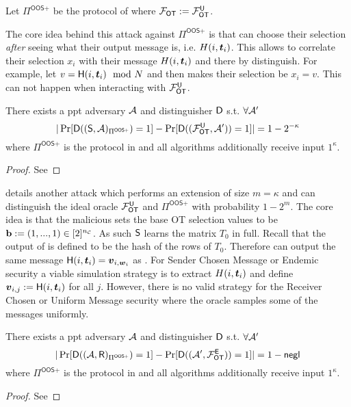 \begin{definition}\label{def:OOS2}
	Let $\Pi^{\textsf{OOS+}}$ be the protocol of  where $\OOT:=\OOT^\U$.
\end{definition}


The core idea behind this attack against $\Pi^{\textsf{OOS+}}$ is that \rec can choose their selection \emph{after} seeing what their output message is, i.e. $H(i,\tt_i)$. This allows \rec to correlate their selection $x_i$ with their message $H(i,\tt_i)$ and there by distinguish. For example, let $v=\H(i,\tt_i)\mod N$ and then \rec makes their selection be $x_i=v$. This can not happen when interacting with $\OOT^\U$.

\begin{lemma} \label{lem:malRec2}
	There exists a ppt adversary $\Adv$ and distinguisher $\D$ s.t.  $\forall\Adv'$ 
	$$
	|\Pr[\D((\send, \Adv)_{\Pi^{\textsf{OOS+}}})=1]-\Pr[\D((\OOT^{\U}, \Adv'))=1]|=1-2^{-\kappa}
	$$
	where $\Pi^{\textsf{OOS+}}$ is the protocol in  and all algorithms additionally receive input $1^\kappa$. 
\end{lemma}
\iffullversion

\else
\begin{proof}
	See  \pe
\end{proof}
\fi




 details another attack which performs an extension of size $m=\kappa$ and can distinguish the ideal oracle $\OOT^\U$ and $\Pi^{\textsf{OOS+}}$ with probability $1-2^m$. The core idea is that the malicious \send sets the base OT selection values to be $\mathbf{b}:=(1,...,1)\in [2]^\nc$. As such $\send$ learns the matrix $T_0$ in full. Recall that the output of \rec is defined to be the hash of the rows of $T_0$. Therefore \send can output the same message $\H(i, \tt_i)=\vv_{i,\ww_i}$ as \rec. For Sender Chosen Message or Endemic security a viable simulation strategy is to extract $H(i, \tt_i)$ and define $\vv_{i,j}:=\H(i, \tt_i)$ for all $j$. However, there is no valid strategy for the Receiver Chosen or Uniform Message security where the oracle samples some of the messages uniformly.

\begin{lemma} \label{lem:malSend}
	There exists a ppt adversary $\Adv$ and distinguisher $\D$ s.t. $\forall\Adv'$ 
	$$
		|\Pr[\D((\Adv, \rec)_{\Pi^{\textsf{OOS+}}})=1]-\Pr[\D((\Adv', \OOT^{\E}))=1]|=1-\negl
	$$
	where $\Pi^{\textsf{OOS+}}$ is the protocol in  and all algorithms additionally receive input $1^\kappa$. 
\end{lemma}
\iffullversion

\else
\begin{proof}
	See  \pe
\end{proof}
\fi





